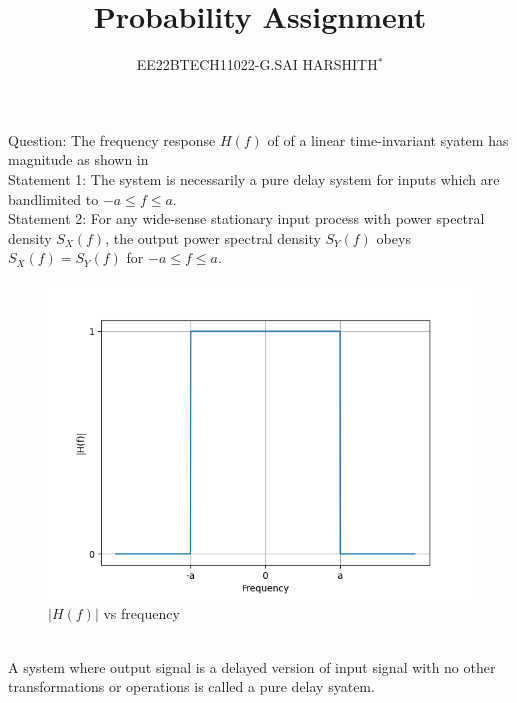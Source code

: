 \documentclass[journal,12pt,twocolumn]{IEEEtran}
\theoremstyle{remark}
\begin{document}

\vspace{3cm}

\title{Probability Assignment}
\author{EE22BTECH11022-G.SAI HARSHITH$^{*}$%
}
\maketitle
\newpage
\bigskip
\renewcommand{\thefigure}{\theenumi}
\renewcommand{\thetable}{\theenumi}

Question: The frequency response $H(f)$ of of a linear time-invariant syatem has magnitude as shown in \\
Statement 1: The system is necessarily a pure delay system for inputs which are bandlimited to $-a \leq f \leq a$.\\
Statement 2: For any wide-sense stationary input process with power spectral density $S_X(f)$, the output power spectral density $S_Y(f)$ obeys $S_X(f)=S_Y(f)$ for $-a \leq f \leq a$.\\
\begin{figure}[!ht]
\centering
\includegraphics[width=\columnwidth]{figs/figure.png}
\caption{$|H(f)|$ vs frequency}
\label{fig:11}
\end{figure}\\
\solution A system where output signal is a delayed version of input signal with no other transformations or operations is called a pure delay syatem.
\end{document}
